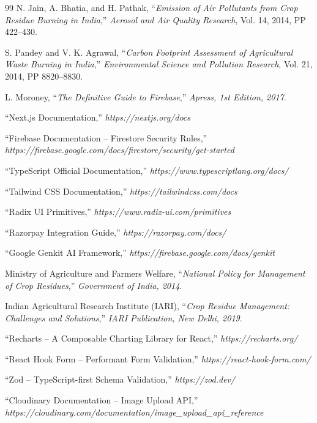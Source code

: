 \documentclass[a4paper,12pt,oneside]{report}
\begin{document}
\begin{thebibliography}{99}
     N. Jain, A. Bhatia, and H. Pathak, ``\textit{Emission of Air Pollutants from Crop Residue Burning in India},'' \textit{Aerosol and Air Quality Research}, Vol. 14, 2014, PP 422--430.

     S. Pandey and V. K. Agrawal, ``\textit{Carbon Footprint Assessment of Agricultural Waste Burning in India},'' \textit{Environmental Science and Pollution Research}, Vol. 21, 2014, PP 8820--8830.

     L. Moroney, ``\textit{The Definitive Guide to Firebase},'' \textit{Apress, 1st Edition, 2017}.

     ``Next.js Documentation,'' \textit{https://nextjs.org/docs}

     ``Firebase Documentation -- Firestore Security Rules,'' \textit{https://firebase.google.com/docs/firestore/security/get-started}

     ``TypeScript Official Documentation,'' \textit{https://www.typescriptlang.org/docs/}

     ``Tailwind CSS Documentation,'' \textit{https://tailwindcss.com/docs}

     ``Radix UI Primitives,'' \textit{https://www.radix-ui.com/primitives}

     ``Razorpay Integration Guide,'' \textit{https://razorpay.com/docs/}

     ``Google Genkit AI Framework,'' \textit{https://firebase.google.com/docs/genkit}

     Ministry of Agriculture and Farmers Welfare, ``\textit{National Policy for Management of Crop Residues},'' \textit{Government of India, 2014}.

     Indian Agricultural Research Institute (IARI), ``\textit{Crop Residue Management: Challenges and Solutions},'' \textit{IARI Publication, New Delhi, 2019}.

     ``Recharts -- A Composable Charting Library for React,'' \textit{https://recharts.org/}

     ``React Hook Form -- Performant Form Validation,'' \textit{https://react-hook-form.com/}

     ``Zod -- TypeScript-first Schema Validation,'' \textit{https://zod.dev/}

     ``Cloudinary Documentation -- Image Upload API,'' \textit{https://cloudinary.com/documentation/image\_upload\_api\_reference}


\end{thebibliography}
\end{document}
